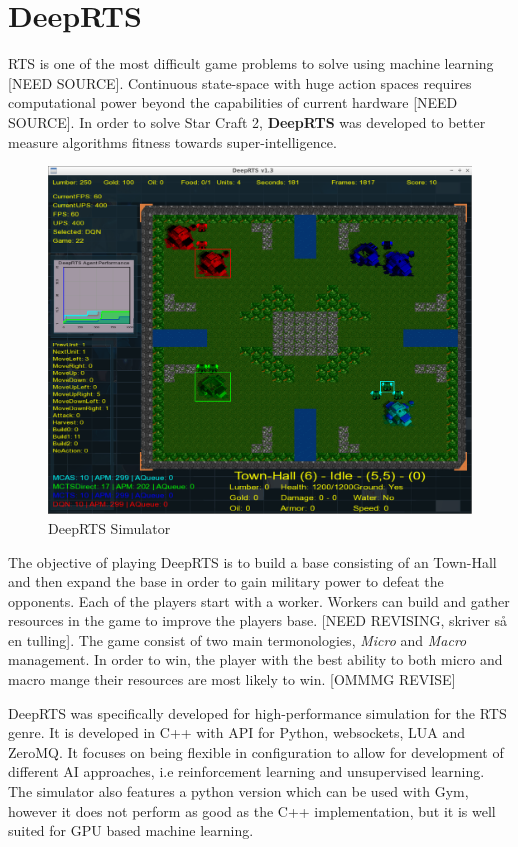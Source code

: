 \documentclass[fleqn,10pt]{article} %
\begin{document}
\section{DeepRTS}
RTS is one of the most difficult game problems to solve using machine learning [NEED SOURCE]. Continuous state-space with huge action spaces requires computational power beyond the capabilities of current hardware [NEED SOURCE]. In order to solve Star Craft 2, \textbf{DeepRTS} was developed to better measure algorithms fitness towards super-intelligence.

\begin{figure}[!htp]\centering
    \includegraphics[width=\linewidth]{deep_rts}
    \caption{DeepRTS Simulator}
    \label{fig:results}
\end{figure}

The objective of playing DeepRTS is to build a base consisting of an Town-Hall and then expand the base in order to gain military power to defeat the opponents. Each of the players start with a worker. Workers can build and gather resources in the game to improve the players base.   [NEED REVISING, skriver så en tulling]. The game consist of two main termonologies, \textit{Micro} and \textit{Macro} management. In order to win, the player with the best ability to both micro and macro mange their resources are most likely to win. [OMMMG REVISE]

DeepRTS was specifically developed for high-performance simulation for the RTS genre. It is developed in C++ with API for Python, websockets, LUA and ZeroMQ. It focuses on being flexible in configuration to allow for development of different AI approaches, i.e reinforcement learning and unsupervised learning. The simulator also features a python version which can be used with Gym, however it does not perform as good as the C++ implementation, but it is well suited for GPU based machine learning.
\end{document}
